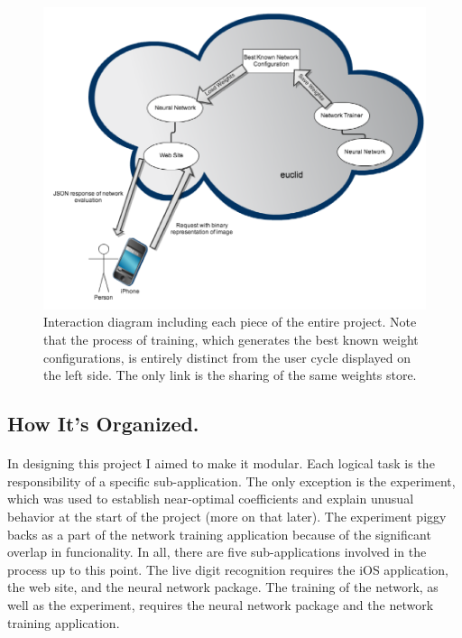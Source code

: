 \documentclass{article}
\begin{document}
    \begin{figure}
        \centering
        \includegraphics[scale=0.4]{images/diagram.png}
        \caption{Interaction diagram including each piece of the entire project.
            Note that the process of training, which generates the best known
            weight configurations, is entirely distinct from the user cycle 
            displayed on the left side. The only link is the sharing of the
            same weights store.}
        \label{diagram}
    \end{figure}

\subsection{How It's Organized.}

    \paragraph{}In designing this project I aimed to make it modular. Each logical
    task is the responsibility of a specific sub-application. The only exception
    is the experiment, which was used to establish near-optimal coefficients and 
    explain unusual behavior at the start of the project (more on that later).
    The experiment piggy backs as a part of the network training application 
    because of the significant overlap in funcionality. In all, there are five
    sub-applications involved in the process up to this point. The 
    live digit recognition requires the iOS application, the web site, and the
    neural network package. The training of the network, as well as the experiment,
    requires the neural network package and the network training application.
\end{document}

